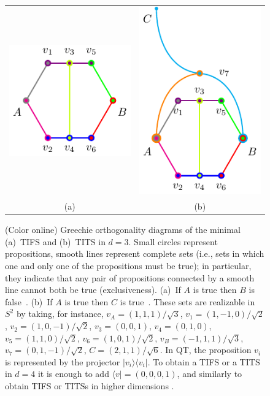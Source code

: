 \documentclass[%
 twocolumn,
 groupedaddress,
 showpacs,
 showkeys,
 preprintnumbers,
 amsmath,amssymb,
 aps,
 pra,
 longbibliography,
 floatfix,
 ]{revtex4-1}
\begin{document}

\begin{figure}
	\begin{center}
		\setlength{\tabcolsep}{0em}
		\begin{tabular}{cc}
			\includegraphics{2018-minimalYIYS_pra_15REVISEDJR-Fig1a.pdf} & \includegraphics{2018-minimalYIYS_pra_15REVISEDJR-Fig1b.pdf} \\
			(a) & (b)
		\end{tabular}
	\end{center}
	\caption{\label{Fig1}
		(Color online)
		Greechie orthogonality diagrams of the minimal
		(a)~TIFS and (b)~TITS in $d=3$.
		Small circles represent propositions, smooth lines represent complete sets
		(i.e., sets in which one and only one of the propositions must be true); in particular, they indicate
		that any pair of propositions connected by a smooth line cannot both be true (exclusiveness).
		(a)~If $A$ is true then $B$ is false~\cite{KS65}.
		(b)~If $A$ is true then $C$ is true~\cite{KS67}.
		These sets are realizable in $S^2$ by taking,
		for instance,
		$v_A = ({1,1,1} )/\sqrt{3}$,
		$v_1 = ({1,-1,0} )/\sqrt{2}$,
		$v_2 = ({1,0,-1} )/\sqrt{2}$,
		$v_3 = ({0,0,1} ) $,
		$v_4 = ({0,1,0} )$,
		$v_5 = ({1,1,0} )/\sqrt{2}$,
		$v_6 = ({1,0,1} )/\sqrt{2}$,
		$v_B = ({-1,1,1}) / \sqrt{3} $,
		$v_7 = ({0,1,-1} )/\sqrt{2}$,
		$C = ({2,1,1} )/\sqrt{6} $.
		In QT, the proposition $v_i$ is represented by the projector $| v_i \rangle\langle v_i |$.
		To obtain a TIFS or a TITS in $d=4$ it
		is enough to add $\langle v| = (0,0,0,1)$, and similarly to obtain TIFS or TITSs in higher dimensions \cite{CG96}.}
\end{figure}
\end{document}
